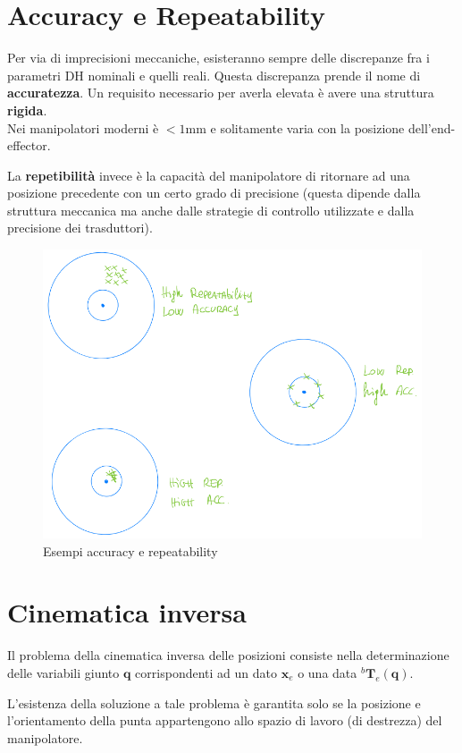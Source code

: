 \section{Accuracy e Repeatability}

Per via di imprecisioni meccaniche, esisteranno sempre delle discrepanze fra i parametri DH nominali e quelli reali. Questa discrepanza prende il nome di \textbf{accuratezza}. Un requisito necessario per averla elevata è avere una struttura \textbf{rigida}.\\
Nei manipolatori moderni è $< 1$mm e solitamente varia con la posizione dell'end-effector.

La \textbf{repetibilità} invece è la capacità del manipolatore di ritornare ad una posizione precedente con un certo grado di precisione (questa dipende dalla struttura meccanica ma anche dalle strategie di controllo utilizzate e dalla precisione dei trasduttori).

\begin{figure}[!hb]
	\centering
	\includegraphics[width=0.6\linewidth]{images/kinematics_15}
	\caption{Esempi accuracy e repeatability}
	\label{fig:kinematics15}
\end{figure}




\section{Cinematica inversa}
Il problema della cinematica inversa delle posizioni consiste nella determinazione delle variabili giunto $\boldsymbol{q}$ corrispondenti ad un dato $\boldsymbol{x}_e$ o una data ${}^b\mathbf{T}_{e}(\mathbf{q})$.

L’esistenza della soluzione a tale problema è garantita solo se la posizione e l’orientamento della punta appartengono allo spazio di lavoro (di destrezza) del manipolatore.

